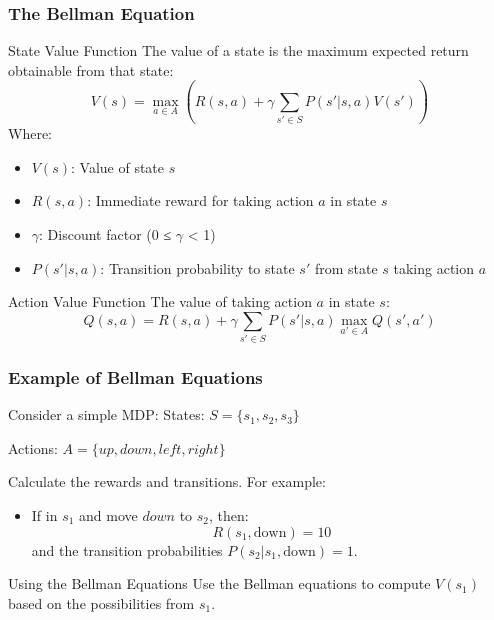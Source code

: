 \documentclass[aspectratio=169]{beamer}
\begin{document}
\begin{frame}[fragile]
    \frametitle{The Bellman Equation}
    \begin{block}{State Value Function}
        The value of a state is the maximum expected return obtainable from that state:
        \begin{equation}
            V(s) = \max_{a \in A} \left( R(s, a) + \gamma \sum_{s' \in S} P(s'|s, a) V(s') \right)
        \end{equation}
        Where:
        \begin{itemize}
            \item $V(s)$: Value of state $s$
            \item $R(s, a)$: Immediate reward for taking action $a$ in state $s$
            \item $\gamma$: Discount factor (0 ≤ $\gamma$ < 1)
            \item $P(s'|s, a)$: Transition probability to state $s'$ from state $s$ taking action $a$
        \end{itemize}
    \end{block}
    
    \begin{block}{Action Value Function}
        The value of taking action $a$ in state $s$:
        \begin{equation}
            Q(s, a) = R(s, a) + \gamma \sum_{s' \in S} P(s'|s, a) \max_{a' \in A} Q(s', a')
        \end{equation}
    \end{block}
\end{frame}

\begin{frame}[fragile]
    \frametitle{Example of Bellman Equations}
    \begin{block}{Consider a simple MDP:}
        States: $S = \{s_1, s_2, s_3\}$
        
        Actions: $A = \{up, down, left, right\}$
        
        Calculate the rewards and transitions. For example:
        \begin{itemize}
            \item If in $s_1$ and move $down$ to $s_2$, then:
            \begin{equation}
                R(s_1, \text{down}) = 10
            \end{equation}
            and the transition probabilities $P(s_2|s_1,\text{down}) = 1$.
        \end{itemize}
    \end{block}
    
    \begin{block}{Using the Bellman Equations}
        Use the Bellman equations to compute $V(s_1)$ based on the possibilities from $s_1$.
    \end{block}
\end{frame}
\end{document}
